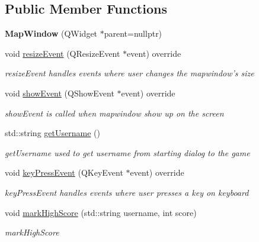 \subsection*{Public Member Functions}
\begin{DoxyCompactItemize}
\item 
\hypertarget{class_game_1_1_map_window_aada219bb81fc36f618ce6c6db562e21f}{{\bfseries Map\-Window} (Q\-Widget $\ast$parent=nullptr)}\label{class_game_1_1_map_window_aada219bb81fc36f618ce6c6db562e21f}

\item 
void \hyperlink{class_game_1_1_map_window_adba5d7b1e410b80248431586d7e06787}{resize\-Event} (Q\-Resize\-Event $\ast$event) override
\begin{DoxyCompactList}\small\item\em resize\-Event handles events where user changes the mapwindow's size \end{DoxyCompactList}\item 
void \hyperlink{class_game_1_1_map_window_a3ad805cd0011042bae64f7c0680dee75}{show\-Event} (Q\-Show\-Event $\ast$event) override
\begin{DoxyCompactList}\small\item\em show\-Event is called when mapwindow show up on the screen \end{DoxyCompactList}\item 
std\-::string \hyperlink{class_game_1_1_map_window_abddb4e34e8944de58ea55dd263a216e8}{get\-Username} ()
\begin{DoxyCompactList}\small\item\em get\-Username used to get username from starting dialog to the game \end{DoxyCompactList}\item 
void \hyperlink{class_game_1_1_map_window_acf9cb2d5196093123ddbddc77b2e8da8}{key\-Press\-Event} (Q\-Key\-Event $\ast$event) override
\begin{DoxyCompactList}\small\item\em key\-Press\-Event handles events where user presses a key on keyboard \end{DoxyCompactList}\item 
void \hyperlink{class_game_1_1_map_window_a27698728d6b09b81f4921e778700c91b}{mark\-High\-Score} (std\-::string username, int score)
\begin{DoxyCompactList}\small\item\em mark\-High\-Score \end{DoxyCompactList}\end{DoxyCompactItemize}


